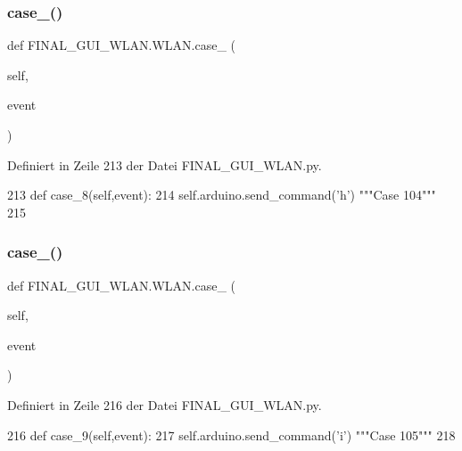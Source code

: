 \subsubsection{\texorpdfstring{case\+\_()}{case\_8()}}
{\footnotesize\ttfamily def F\+I\+N\+A\+L\+\_\+\+G\+U\+I\+\_\+\+W\+L\+A\+N.\+W\+L\+A\+N.\+case\+\_ (\begin{DoxyParamCaption}\item[{}]{self,  }\item[{}]{event }\end{DoxyParamCaption})}



Definiert in Zeile 213 der Datei F\+I\+N\+A\+L\+\_\+\+G\+U\+I\+\_\+\+W\+L\+A\+N.\+py.


\begin{DoxyCode}
213     \textcolor{keyword}{def }case\_8(self,event):
214         self.arduino.send\_command(\textcolor{stringliteral}{'h'})  \textcolor{stringliteral}{"""Case 104"""}
215 
\end{DoxyCode}
\mbox{\label{class_f_i_n_a_l___g_u_i___w_l_a_n_1_1_w_l_a_n_ad19edd013fc170682baac727057a5155}} 
\subsubsection{\texorpdfstring{case\+\_()}{case\_9()}}
{\footnotesize\ttfamily def F\+I\+N\+A\+L\+\_\+\+G\+U\+I\+\_\+\+W\+L\+A\+N.\+W\+L\+A\+N.\+case\+\_ (\begin{DoxyParamCaption}\item[{}]{self,  }\item[{}]{event }\end{DoxyParamCaption})}



Definiert in Zeile 216 der Datei F\+I\+N\+A\+L\+\_\+\+G\+U\+I\+\_\+\+W\+L\+A\+N.\+py.


\begin{DoxyCode}
216     \textcolor{keyword}{def }case\_9(self,event):
217         self.arduino.send\_command(\textcolor{stringliteral}{'i'})  \textcolor{stringliteral}{"""Case 105"""}
218     
\end{DoxyCode}
\mbox{\label{class_f_i_n_a_l___g_u_i___w_l_a_n_1_1_w_l_a_n_acc83d940a64c2af519b20fb3b0f1875d}} 
